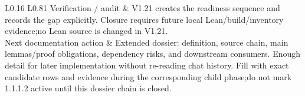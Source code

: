 \begin{longtable}{L{0.16\linewidth} L{0.81\linewidth}}
\hline\addlinespace[0.20em]
Verification /\allowbreak{} audit & V1.21 creates the readiness sequence and records the gap explicitly. Closure requires future local Lean/\allowbreak{}build/\allowbreak{}inventory evidence;\newline no Lean source is changed in V1.21.\\
\hline\addlinespace[0.20em]
Next documentation action & Extended dossier: definition, source chain, main lemmas/\allowbreak{}proof obligations, dependency risks, and downstream consumers. Enough detail for later implementation without re-reading chat history. Fill with exact candidate rows and evidence during the corresponding child phase;\newline do not mark 1.1.1.2 active until this dossier chain is closed.\\
\hline\addlinespace[0.20em]
\end{longtable}
